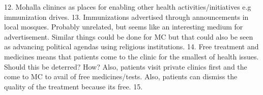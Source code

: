 12. Mohalla clinincs as places for enabling other health activities/initiatives e.g immunization drives.
13. Immunizations advertised through announcements in local mosques. Probably unrelated, but seems like an interesting medium for advertisement. Similar things could be done for MC but that could also be seen as advancing political agendas using religious institutions.
14. Free treatment and medicines means that patients come to the clinic for the smallest of health issues. Should this be deterred? How? Also, patients visit private clinics first and the come to MC to avail of free medicines/tests. Also, patients can dismiss the quality of the treatment because its free. 
15. 